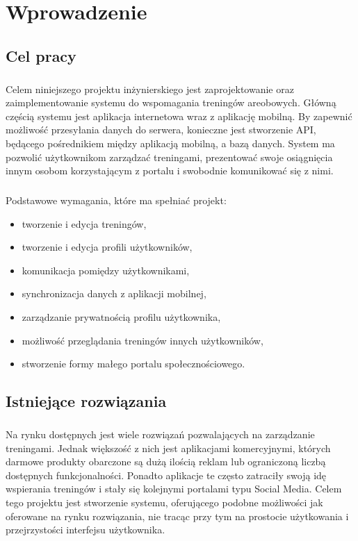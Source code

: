 \chapter{Wprowadzenie}

\section{Cel pracy}
\label{sec:cel_pracy}
\paragraph{}
Celem niniejszego projektu inżynierskiego jest zaprojektowanie oraz zaimplementowanie systemu do wspomagania treningów areobowych. Główną częścią systemu jest aplikacja internetowa wraz z aplikację mobilną. By zapewnić możliwość przesyłania danych do serwera, konieczne jest stworzenie API, będącego pośrednikiem między aplikacją mobilną, a bazą danych.
System ma pozwolić użytkownikom zarządzać treningami, prezentować swoje osiągnięcia innym osobom korzystającym z portalu i swobodnie komunikować się z nimi.
\paragraph{} %
\label{par:}
Podstawowe wymagania, które ma spełniać projekt:
\begin{itemize}
	\item tworzenie i edycja treningów,
	\item tworzenie i edycja profili użytkowników,
	\item komunikacja pomiędzy użytkownikami,
	\item synchronizacja danych z aplikacji mobilnej,
	\item zarządzanie prywatnością profilu użytkownika,
	\item możliwość przeglądania treningów innych użytkowników,
	\item stworzenie formy małego portalu społecznościowego.
\end{itemize}

\section{Istniejące rozwiązania}
\paragraph{}
Na rynku dostępnych jest wiele rozwiązań pozwalających na zarządzanie treningami. Jednak większość z nich jest aplikacjami komercyjnymi, których darmowe produkty obarczone są dużą ilością reklam lub ograniczoną liczbą dostępnych funkcjonalności. Ponadto aplikacje te często zatraciły swoją idę wspierania treningów i stały się kolejnymi portalami typu Social Media. Celem tego projektu jest stworzenie systemu, oferującego podobne możliwości jak oferowane na rynku rozwiązania, nie tracąc przy tym na prostocie użytkowania i przejrzystości interfejsu użytkownika.
